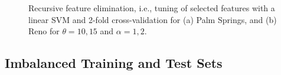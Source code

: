 \documentclass[10pt, conference, compsocconf]{IEEEtran}
\begin{document}
\begin{figure}[thb] %
\centering
\caption{Recursive feature elimination, i.e., tuning of selected features with a linear SVM and 2-fold cross-validation for (a) Palm Springs, and (b) Reno for $\theta = 10,15$ and $\alpha = 1,2$.}
\label{fig:features}
\end{figure}




\subsection{Imbalanced Training and Test Sets}
\end{document}

